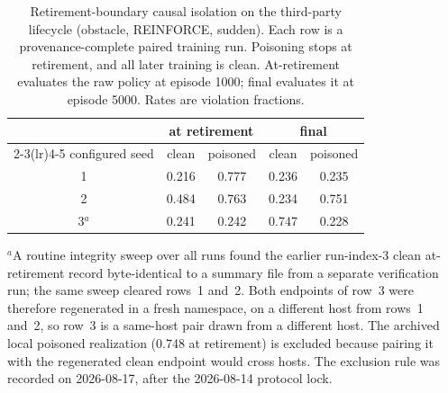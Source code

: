 \begin{table}[t]
\centering
\caption{Retirement-boundary causal isolation on the third-party lifecycle
(obstacle, REINFORCE, sudden).  Each row is a provenance-complete paired
training run.  Poisoning stops at retirement, and all later training is
clean.  At-retirement evaluates the raw policy at episode 1000; final
evaluates it at episode 5000.  Rates are violation fractions.}
\label{tab:carr-isolation}
\small
\begin{tabular}{@{}ccccc@{}}
\toprule
 & \multicolumn{2}{c}{at retirement} & \multicolumn{2}{c}{final}\\
\cmidrule(lr){2-3}\cmidrule(lr){4-5}
configured seed & clean & poisoned & clean & poisoned\\
\midrule
1 & 0.216 & 0.777 & 0.236 & 0.235\\
2 & 0.484 & 0.763 & 0.234 & 0.751\\
3$^a$ & 0.241 & 0.242 & 0.747 & 0.228\\
\bottomrule
\end{tabular}
\vspace{2pt}\par
\begin{minipage}{\columnwidth}\raggedright\footnotesize
$^a$A routine integrity sweep over all runs found the earlier run-index-3
clean at-retirement record byte-identical to a summary file from a separate
verification run; the same sweep cleared rows~1 and~2.  Both endpoints of
row~3 were therefore regenerated in a fresh namespace, on a different host
from rows~1 and~2, so row~3 is a same-host pair drawn from a different host.
The archived local poisoned realization (0.748 at retirement) is excluded
because pairing it with the regenerated clean endpoint would cross hosts.  The
exclusion rule was recorded on 2026-08-17, after the 2026-08-14 protocol lock.
\end{minipage}
\end{table}

